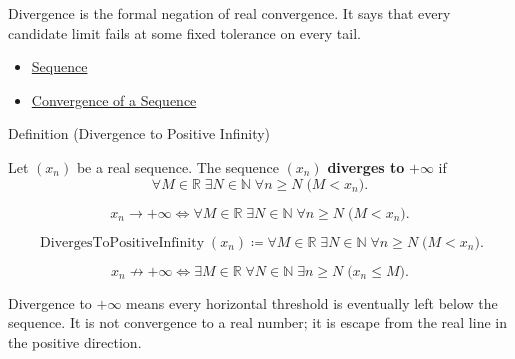 \begin{remark*}[Interpretation]
Divergence is the formal negation of real convergence. It says that every
candidate limit fails at some fixed tolerance on every tail.
\end{remark*}

\begin{remark*}[Dependencies]\hfill
\begin{itemize}
  \item \hyperref[def:sequence]{Sequence}
  \item \hyperref[def:convergent-sequence]{Convergence of a Sequence}
\end{itemize}
\end{remark*}


\begin{definitionbox}{Definition (Divergence to Positive Infinity)}
\begin{definition}
\label{def:diverges-to-positive-infinity}
Let $(x_n)$ be a real sequence. The sequence $(x_n)$ \textbf{diverges to}
$+\infty$ if
\[
  \forall M\in\mathbb{R}\;\exists N\in\mathbb{N}\;\forall n\ge N
  \;\bigl(M<x_n\bigr).
\]
\end{definition}
\end{definitionbox}

\begin{remark*}
\[
x_n\to+\infty
\Longleftrightarrow
\forall M\in\mathbb{R}\;\exists N\in\mathbb{N}\;\forall n\ge N
\;\bigl(M<x_n\bigr).
\]
\end{remark*}

\begin{remark*}
\[
\operatorname{DivergesToPositiveInfinity}(x_n)
\coloneqq
\forall M\in\mathbb{R}\;\exists N\in\mathbb{N}\;\forall n\ge N
\;\bigl(M<x_n\bigr).
\]
\end{remark*}

\begin{remark*}
\[
x_n\not\to+\infty
\Longleftrightarrow
\exists M\in\mathbb{R}\;\forall N\in\mathbb{N}\;\exists n\ge N
\;\bigl(x_n\le M\bigr).
\]
\end{remark*}

\begin{remark*}[Interpretation]
Divergence to $+\infty$ means every horizontal threshold is eventually left
below the sequence. It is not convergence to a real number; it is escape from
the real line in the positive direction.
\end{remark*}

